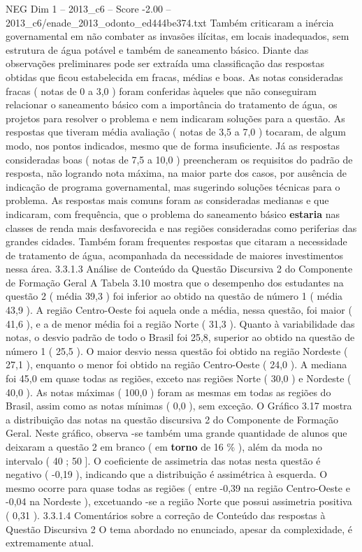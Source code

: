 \begin{textsample}{NEG Dim 1 – 2013\_c6 – Score -2.00 – 2013\_c6/enade\_2013\_odonto\_ed444be374.txt}
Também criticaram a inércia governamental em não combater as invasões ilícitas, em locais inadequados, sem estrutura de água potável e também de saneamento básico.
Diante das observações preliminares pode ser extraída uma classificação das respostas obtidas que ficou estabelecida em fracas, médias e boas.
As notas consideradas fracas ( notas de 0 a 3,0 ) foram conferidas àqueles que não conseguiram relacionar o saneamento básico com a importância do tratamento de água, os projetos para resolver o problema e nem indicaram soluções para a questão.
As respostas que tiveram média avaliação ( notas de 3,5 a 7,0 ) tocaram, de algum modo, nos pontos indicados, mesmo que de forma insuficiente.
Já as respostas consideradas boas ( notas de 7,5 a 10,0 ) preencheram os requisitos do padrão de resposta, não logrando nota máxima, na maior parte dos casos, por ausência de indicação de programa governamental, mas sugerindo soluções técnicas para o problema.
As respostas mais comuns foram as consideradas medianas e que indicaram, com frequência, que o problema do saneamento básico \textbf{estaria} nas classes de renda mais desfavorecida e nas regiões consideradas como periferias das grandes cidades.
Também foram frequentes respostas que citaram a necessidade de tratamento de água, acompanhada da necessidade de maiores investimentos nessa área. 3.3.1.3 Análise de Conteúdo da Questão Discursiva 2 do Componente de Formação Geral A Tabela 3.10 mostra que o desempenho dos estudantes na questão 2 ( média 39,3 ) foi inferior ao obtido na questão de número 1 ( média 43,9 ).
A região Centro-Oeste foi aquela onde a média, nessa questão, foi maior ( 41,6 ), e a de menor média foi a região Norte ( 31,3 ).
Quanto à variabilidade das notas, o desvio padrão de todo o Brasil foi 25,8, superior ao obtido na questão de número 1 ( 25,5 ).
O maior desvio nessa questão foi obtido na região Nordeste ( 27,1 ), enquanto o menor foi obtido na região Centro-Oeste ( 24,0 ).
A mediana foi 45,0 em quase todas as regiões, exceto nas regiões Norte ( 30,0 ) e Nordeste ( 40,0 ).
As notas máximas ( 100,0 ) foram as mesmas em todas as regiões do Brasil, assim como as notas mínimas ( 0,0 ), sem exceção.
O Gráfico 3.17 mostra a distribuição das notas na questão discursiva 2 do Componente de Formação Geral.
Neste gráfico, observa -se também uma grande quantidade de alunos que deixaram a questão 2 em branco ( em \textbf{torno} de 16 \% ), além da moda no intervalo ( 40 ; 50 ].
O coeficiente de assimetria das notas nesta questão é negativo ( -0,19 ), indicando que a distribuição é assimétrica à esquerda.
O mesmo ocorre para quase todas as regiões ( entre -0,39 na região Centro-Oeste e -0,04 na Nordeste ), excetuando -se a região Norte que possui assimetria positiva ( 0,31 ). 3.3.1.4 Comentários sobre a correção de Conteúdo das respostas à Questão Discursiva 2 O tema abordado no enunciado, apesar da complexidade, é extremamente atual.

\end{textsample}
